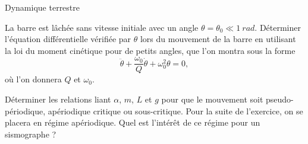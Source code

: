 \begin{exo}[PC][1][devoir]{Dynamique terrestre}
\begin{quest}

\item La barre est lâchée sans vitesse initiale avec un angle $\theta=\theta_0 \ll \SI{1}{rad}$. Déterminer l'équation différentielle vérifiée par $\theta$ lors du mouvement de la barre en utilisant la loi du moment cinétique pour de petits angles, que l'on montra sous la forme
\begin{equation}
  \ddot{\theta} + \frac{\omega_0}{Q} \dot{\theta} + \omega_0^2 \theta = 0,
\end{equation}
où l'on donnera $Q$ et $\omega_0$.




\item Déterminer les relations liant $\alpha$, $m$, $L$ et $g$ pour que le mouvement soit pseudo-périodique, apériodique critique ou sous-critique. Pour la suite de l'exercice, on se placera en régime apériodique. Quel est l'intérêt de ce régime pour un sismographe ?


\end{quest}
\end{exo}
